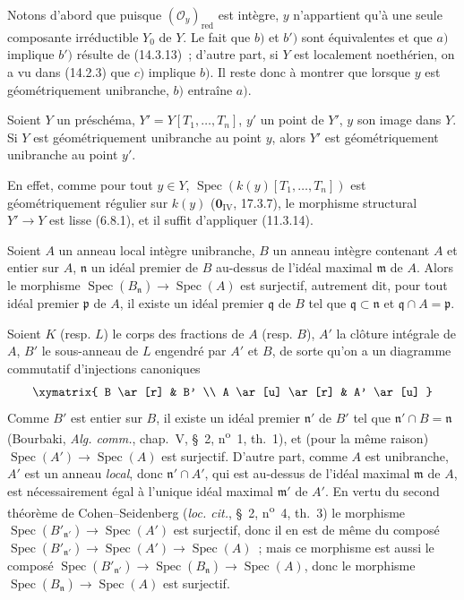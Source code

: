 Notons d'abord que puisque $(\mathcal O_y)_{\mathrm{red}}$ est intègre, $y$
n'appartient qu'à une seule composante irréductible $Y_0$ de $Y$. Le fait que $b)$
et $b')$ sont équivalentes et que $a)$ implique $b')$ résulte de (14.3.13)~;
d'autre part, si $Y$ est localement noethérien, on a vu dans (14.2.3) que $c)$
implique $b)$. Il reste donc à montrer que lorsque $y$ est géométriquement
unibranche, $b)$ entraîne $a)$.

\begin{lemma}[14.4.1.1]
\label{IV.14.4.1.1-fr}
Soient $Y$ un préschéma, $Y'=Y[T_1,\ldots,T_n]$, $y'$ un point de $Y'$, $y$ son
image dans $Y$. Si $Y$ est géométriquement unibranche au point $y$, alors $Y'$ est
géométriquement unibranche au point $y'$.
\end{lemma}

En effet, comme pour tout $y\in Y$,
$\operatorname{Spec}(k(y)[T_1,\ldots,T_n])$ est géométriquement régulier sur $k(y)$
($\mathbf{0}_{\mathrm{IV}}$, 17.3.7), le morphisme structural $Y'\to Y$ est lisse
(6.8.1), et il suffit d'appliquer (11.3.14).

\begin{lemma}[14.4.1.2]
\label{IV.14.4.1.2-fr}
Soient $A$ un anneau local intègre unibranche, $B$ un anneau intègre contenant $A$
et entier sur $A$, $\mathfrak n$ un idéal premier de $B$ au-dessus de l'idéal
maximal $\mathfrak m$ de $A$. Alors le morphisme
$\operatorname{Spec}(B_{\mathfrak n})\to\operatorname{Spec}(A)$ est surjectif,
autrement dit, pour tout idéal premier $\mathfrak p$ de $A$, il existe un idéal
premier $\mathfrak q$ de $B$ tel que $\mathfrak q\subset\mathfrak n$ et
$\mathfrak q\cap A=\mathfrak p$.
\end{lemma}

Soient $K$ (resp. $L$) le corps des fractions de $A$ (resp. $B$), $A'$ la clôture
intégrale de $A$, $B'$ le sous-anneau de $L$ engendré par $A'$ et $B$, de sorte
qu'on a un diagramme commutatif d'injections canoniques
\[
  \xymatrix{
    B \ar[r] & B' \\
    A \ar[u] \ar[r] & A' \ar[u]
  }
\]
Comme $B'$ est entier sur $B$, il existe un idéal premier $\mathfrak n'$ de $B'$
tel que $\mathfrak n'\cap B=\mathfrak n$ (Bourbaki, \emph{Alg. comm.}, chap.~V,
\S~2, n\textsuperscript{o}~1, th.~1), et (pour la même raison)
$\operatorname{Spec}(A')\to\operatorname{Spec}(A)$ est surjectif. D'autre part,
comme $A$ est unibranche, $A'$ est un anneau \emph{local}, donc
$\mathfrak n'\cap A'$, qui est au-dessus de l'idéal maximal $\mathfrak m$ de $A$,
est nécessairement égal à l'unique idéal maximal $\mathfrak m'$ de $A'$. En vertu
du second théorème de Cohen--Seidenberg (\emph{loc. cit.}, \S~2,
n\textsuperscript{o}~4, th.~3) le morphisme
$\operatorname{Spec}(B'_{\mathfrak n'})\to\operatorname{Spec}(A')$ est surjectif,
donc il en est de même du composé
$\operatorname{Spec}(B'_{\mathfrak n'})\to\operatorname{Spec}(A')\to
\operatorname{Spec}(A)$~; mais ce morphisme est aussi le composé
$\operatorname{Spec}(B'_{\mathfrak n'})\to\operatorname{Spec}(B_{\mathfrak n})
\to\operatorname{Spec}(A)$, donc le morphisme
$\operatorname{Spec}(B_{\mathfrak n})\to\operatorname{Spec}(A)$ est surjectif.


